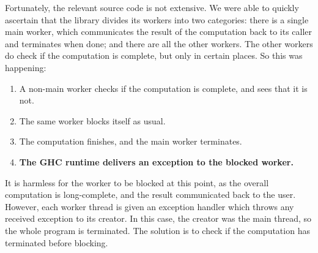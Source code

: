 Fortunately, the relevant source code is not extensive.  We were able
to quickly ascertain that the library divides its workers into two
categories: there is a single main worker, which communicates the
result of the computation back to its caller and terminates when done;
and there are all the other workers.  The other workers do check if
the computation is complete, but only in certain places.  So this was
happening:

\begin{enumerate}
\item A non-main worker checks if the computation is complete, and
  sees that it is not.
\item The same worker blocks itself as usual.
\item The computation finishes, and the main worker terminates.
\item \textbf{The GHC runtime delivers an exception to the blocked
    worker.}
\end{enumerate}

It is harmless for the worker to be blocked at this point, as the
overall computation is long-complete, and the result communicated back
to the user.  However, each worker thread is given an exception
handler which throws any received exception to its creator.  In this
case, the creator was the main thread, so the whole program is
terminated.  The solution is to check if the computation has
terminated before blocking.

